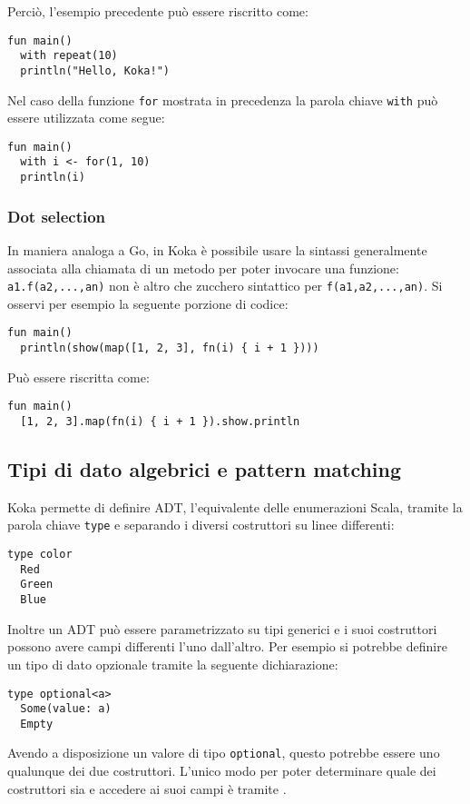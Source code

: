 Perciò, l'esempio precedente può essere riscritto come:
\begin{lstlisting}[language=koka]
fun main()
  with repeat(10)
  println("Hello, Koka!")
\end{lstlisting}

Nel caso della funzione \lstinline{for} mostrata in precedenza la parola chiave \lstinline{with} può essere utilizzata come segue:
\begin{lstlisting}[language=koka]
fun main()
  with i <- for(1, 10)
  println(i)
\end{lstlisting}

\subsubsection{Dot selection}
In maniera analoga a Go, in Koka è possibile usare la sintassi generalmente associata alla chiamata di un metodo per poter invocare una funzione: \lstinline{a1.f(a2,...,an)} non è altro che zucchero sintattico per \lstinline{f(a1,a2,...,an)}.
Si osservi per esempio la seguente porzione di codice:
\begin{lstlisting}[language=koka]
fun main()
  println(show(map([1, 2, 3], fn(i) { i + 1 })))
\end{lstlisting}
Può essere riscritta come:
\begin{lstlisting}[language=koka]
fun main()
  [1, 2, 3].map(fn(i) { i + 1 }).show.println
\end{lstlisting}

\subsection{Tipi di dato algebrici e pattern matching}
Koka permette di definire \ac{ADT}, l'equivalente delle enumerazioni Scala, tramite la parola chiave \lstinline{type} e separando i diversi costruttori su linee differenti:
\begin{lstlisting}[language=koka]
type color
  Red
  Green
  Blue
\end{lstlisting}
Inoltre un ADT può essere parametrizzato su tipi generici e i suoi costruttori possono avere campi differenti l'uno dall'altro. Per esempio si potrebbe definire un tipo di dato opzionale tramite la seguente dichiarazione:
\begin{lstlisting}[language=koka]
type optional<a>
  Some(value: a)
  Empty
\end{lstlisting}
Avendo a disposizione un valore di tipo \lstinline{optional}, questo potrebbe essere uno qualunque dei due costruttori. L'unico modo per poter determinare quale dei costruttori sia e accedere ai suoi campi è tramite .

